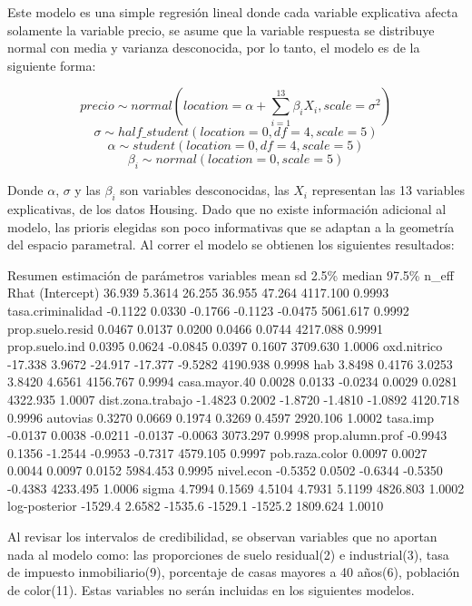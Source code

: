 \documentclass[nojss]{jss}
\begin{document}
Este modelo es una simple regresión lineal donde cada variable explicativa afecta solamente la variable precio, se asume que la variable respuesta se distribuye normal con media y varianza desconocida, por lo tanto, el modelo es de la siguiente forma:

$$precio \sim normal(location = \alpha + \sum_{i=1}^{13}\beta_i X_i,scale =  \sigma^2)$$
$$\sigma \sim half\_student(location = 0,df = 4,scale = 5)$$ 
$$\alpha \sim student(location = 0,df = 4,scale = 5)$$ 
$$\beta_i \sim normal(location = 0,scale = 5)$$

Donde $\alpha$, $\sigma$ y las $\beta_i$ son variables desconocidas, las $X_i$ representan las 13 variables explicativas, de los datos Housing. Dado que no existe información adicional al modelo, las prioris elegidas son poco informativas que se adaptan a la geometría del espacio parametral. Al correr el modelo se obtienen los siguientes resultados:

\begin{CodeChunk}	
\begin{CodeOutput}
 		Resumen estimación de parámetros	
   variables        mean    sd    2.5\%   median   97.5\%   n_eff    Rhat
(Intercept)        36.939 5.3614  26.255  36.955  47.264  4117.100  0.9993
tasa.criminalidad -0.1122 0.0330 -0.1766 -0.1123 -0.0475  5061.617  0.9992
prop.suelo.resid   0.0467 0.0137  0.0200  0.0466  0.0744  4217.088  0.9991
prop.suelo.ind     0.0395 0.0624 -0.0845  0.0397  0.1607  3709.630  1.0006
oxd.nitrico       -17.338 3.9672 -24.917 -17.377 -9.5282  4190.938  0.9998
hab                3.8498 0.4176  3.0253  3.8420  4.6561  4156.767  0.9994
casa.mayor.40      0.0028 0.0133 -0.0234  0.0029  0.0281  4322.935  1.0007
dist.zona.trabajo -1.4823 0.2002 -1.8720 -1.4810 -1.0892  4120.718  0.9996
autovias           0.3270 0.0669  0.1974  0.3269  0.4597  2920.106  1.0002
tasa.imp          -0.0137 0.0038 -0.0211 -0.0137 -0.0063  3073.297  0.9998
prop.alumn.prof   -0.9943 0.1356 -1.2544 -0.9953 -0.7317  4579.105  0.9997
pob.raza.color     0.0097 0.0027  0.0044  0.0097  0.0152  5984.453  0.9995
nivel.econ        -0.5352 0.0502 -0.6344 -0.5350 -0.4383  4233.495  1.0006
sigma              4.7994 0.1569  4.5104  4.7931  5.1199  4826.803  1.0002
log-posterior     -1529.4 2.6582 -1535.6 -1529.1 -1525.2  1809.624  1.0010 
\end{CodeOutput}
\end{CodeChunk}

Al revisar los intervalos de credibilidad, se observan variables que no aportan nada al modelo como: las proporciones de suelo residual(2) e industrial(3), tasa de impuesto inmobiliario(9), porcentaje de casas mayores a 40 años(6), población de color(11). Estas variables no serán incluidas en los siguientes modelos.
\end{document}
